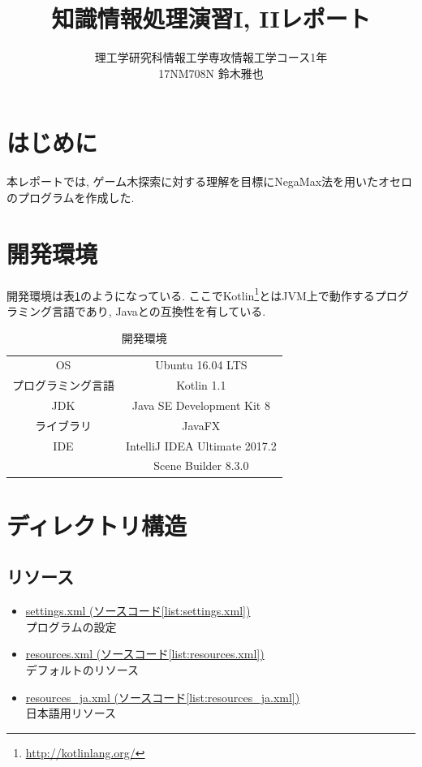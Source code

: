 \documentclass[uplatex,titlepage]{jsarticle}
\title{知識情報処理演習I, IIレポート}
\author{理工学研究科情報工学専攻情報工学コース1年\\17NM708N 鈴木雅也}
\begin{document}
\maketitle
\section{はじめに}
本レポートでは, ゲーム木探索に対する理解を目標にNegaMax法を用いたオセロのプログラムを作成した.

\section{開発環境}
開発環境は表\ref{tab:開発環境}のようになっている. ここでKotlin\footnote{\url{http://kotlinlang.org/}}とはJVM上で動作するプログラミング言語であり, Javaとの互換性を有している.
\begin{table}[h]
\begin{center}
\label{tab:開発環境}
\caption{開発環境}
\begin{tabular}{c|c}
\hline
\hline
OS & Ubuntu 16.04 LTS \\
プログラミング言語 & Kotlin 1.1 \\
JDK & Java SE Development Kit 8 \\
ライブラリ & JavaFX \\
IDE & IntelliJ IDEA Ultimate 2017.2 \\
 & Scene Builder 8.3.0 \\ \hline
\end{tabular}
\end{center}
\end{table}


\section{ディレクトリ構造}
\subsection{リソース}
\begin{itemize}
\item \underline{settings.xml (ソースコード\ref{list:settings.xml})}\\
プログラムの設定
\item \underline{resources.xml (ソースコード\ref{list:resources.xml})}\\
デフォルトのリソース
\item \underline{resources\_ja.xml (ソースコード\ref{list:resources_ja.xml})}\\
日本語用リソース
\end{itemize}
\end{document}
